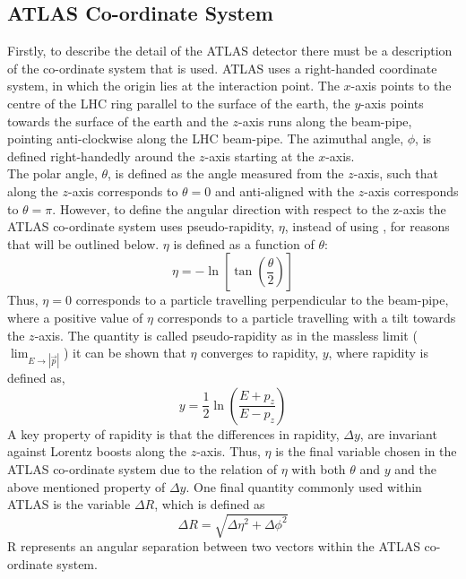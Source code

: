 \subsection{ATLAS Co-ordinate System}

Firstly, to describe the detail of the ATLAS detector there must be a description of the co-ordinate system that is used.
ATLAS uses a right-handed coordinate system, in which the origin lies at the interaction point.
The $x$-axis points to the centre of the LHC ring parallel to the surface of the earth,
the $y$-axis points towards the surface of the earth
and the $z$-axis runs along the beam-pipe, pointing anti-clockwise along the LHC beam-pipe.
The azimuthal angle, $\phi$, is defined right-handedly around the $z$-axis starting at the $x$-axis.
\\

The polar angle, $\theta$, is defined as the angle measured from the $z$-axis,
such that along the $z$-axis corresponds to $\theta = 0$
and anti-aligned with the $z$-axis corresponds to $\theta = \pi$.
However, to define the angular direction with respect to the z-axis the ATLAS co-ordinate system uses pseudo-rapidity, $\eta$, instead of using \theta, for reasons that will be outlined below.
$\eta$ is defined as a function of $\theta$:
\begin{equation}
 \eta = -\ln\left[\tan\left( \frac{\theta}{2} \right) \right]
\end{equation}
Thus, $\eta = 0$ corresponds to a particle travelling perpendicular to the beam-pipe,
where a positive value of $\eta$ corresponds to a particle travelling with a tilt towards the $z$-axis.
The quantity is called pseudo-rapidity as in the massless limit ($\lim_{E\to|\vec{p}|}$)
it can be shown that $\eta$ converges to rapidity, $y$, where rapidity is defined as,
\begin{equation}
  y = \frac{1}{2} \ln \left( \frac{E+p_{z}}{E-p_{z}} \right)
\end{equation}
A key property of rapidity is that the differences in rapidity, $\Delta y$, are invariant against Lorentz boosts along the $z$-axis.
Thus, $\eta$ is the final variable chosen in the ATLAS co-ordinate system due to the relation of $\eta$ with both $\theta$ and $y$
and the above mentioned property of $\Delta y$.
One final quantity commonly used within ATLAS is the variable $\Delta R$, which is defined as
\begin{equation}
  \Delta R = \sqrt{\Delta\eta^{2} + \Delta\phi^{2}}
\end{equation}
\Delta R represents an angular separation between two vectors within the ATLAS co-ordinate system.\\


